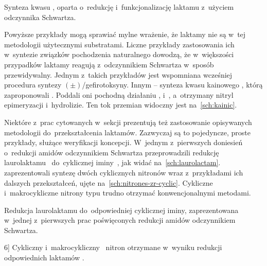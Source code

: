 \begin{scheme*}
  
  \caption{
    Synteza kwasu  , oparta o~redukcję
    i~funkcjonalizację laktamu  z~użyciem odczynnika Schwartza.
  }
  \label{sch:kainic}
\end{scheme*}
Powyższe przykłady mogą sprawiać mylne wrażenie, że laktamy nie są w~tej metodologii
  użytecznymi substratami.
Liczne przykłady zastosowania ich w~syntezie związków pochodzenia naturalnego dowodzą,
  że w~większości przypadków laktamy reagują z~odczynnikiem Schwartza w~sposób przewidywalny.
Jednym z~takich przykładów jest wspomniana wcześniej procedura syntezy
  $(\pm)$\-/gefirotoksyny.
Innym \--- synteza kwasu kainowego , którą zaproponowali
  \citeauthor{xia01}.
Poddali oni pochodną   działaniu \schwartz{},
  i~, a~otrzymany nitryl  epimeryzacji i~hydrolizie.
Ten tok przemian widoczny jest na~\cref{sch:kainic}.

Niektóre z~prac cytowanych w~sekcji \textit{} prezentują też
  zastosowanie opisywanych metodologii do~przekształcenia laktamów.
Zazwyczaj są to pojedyncze, proste przykłady, służące weryfikacji koncepcji.
W~jednym z~pierwszych doniesień o~redukcji amidów odczynnikiem Schwartza \citeauthor{schedler93}
  przeprowadzili redukcję laurolaktamu~ do~cyklicznej
  iminy~, jak widać na~\cref{sch:laurolactam}.
\citeauthor{katahara17} zaprezentowali syntezę dwóch cyklicznych nitronów wraz z~przykładami ich
  dalszych przekształceń, ujęte na~\cref{sch:nitrones-zr-cyclic}.
Cykliczne i~makrocykliczne nitrony typu  trudno
  otrzymać konwencjonalnymi metodami.
\begin{marginscheme}[-25\baselineskip]
  
  \caption{
    Redukcja laurolaktamu do~odpowiedniej cyklicznej iminy, zaprezentowana w~jednej z~pierwszych
      prac poświęconych redukcji amidów odczynnikiem Schwartza.
    }
    \label{sch:laurolactam}
\end{marginscheme}
\begin{scheme*}
  
  \caption[][6\baselineskip]{
    Cykliczny  i~makrocykliczny~ nitron
      otrzymane w~wyniku redukcji odpowiednich laktamów .
  }
  \label{sch:nitrones-zr-cyclic}
\end{scheme*}

